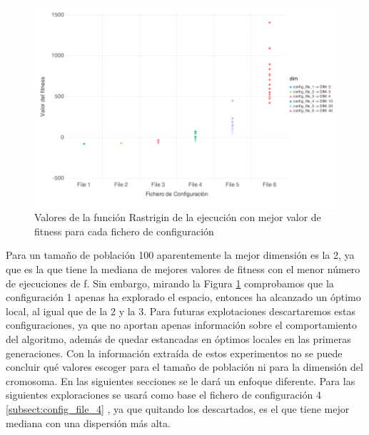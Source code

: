 \begin{figure}[]
	\centering	
	\includegraphics[scale=0.4]{../data/Plots/config_file_1-6_Rastrigin_box_plots.png}
	\caption{ Valores de la función Rastrigin de la ejecución con mejor valor de fitness para cada fichero de configuración }
    \label{fig:box_plots}
\end{figure}

Para un tamaño de población 100 aparentemente la mejor dimensión es la 2, ya que es la que tiene la mediana de mejores valores de fitness con el
menor número de ejecuciones de f. Sin embargo, mirando la Figura \ref{fig:box_plots} comprobamos
que la configuración 1 apenas ha explorado el espacio, entonces ha alcanzado un óptimo local, al igual que de la 2 y la 3. Para
futuras explotaciones descartaremos estas configuraciones, ya que no aportan apenas información sobre el comportamiento del algoritmo, además
de quedar estancadas en óptimos locales en las primeras generaciones. Con la información extraída de estos experimentos no se puede concluir 
qué valores escoger para el tamaño de población ni para la dimensión del cromosoma. En las siguientes secciones se le dará un enfoque diferente.
Para las siguientes exploraciones se usará como base el fichero de configuración 4 \ref{subsect:config_file_4} , ya que quitando los descartados, es el que tiene mejor mediana 
con una dispersión más alta.
